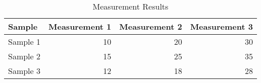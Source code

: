 
\begin{table}[htb]
\centering
\caption{Measurement Results}
\begin{tabular}{lrrr}
\toprule
 Sample   &   Measurement 1 &   Measurement 2 &   Measurement 3 \\
\midrule
 Sample 1 &              10 &              20 &              30 \\
 Sample 2 &              15 &              25 &              35 \\
 Sample 3 &              12 &              18 &              28 \\
\bottomrule
\end{tabular}
\end{table}
